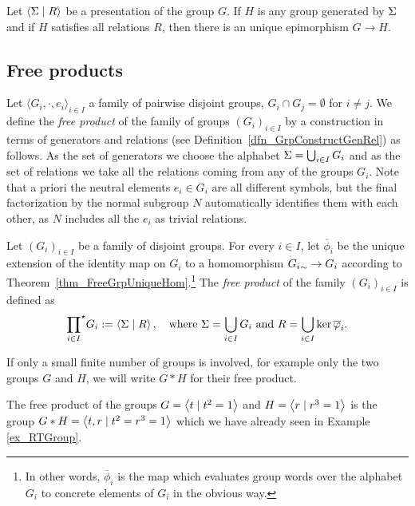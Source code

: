 \begin{theorem}
Let $\left\langle \Sigma \mid R \right\rangle$ be a presentation of the group $G$. If $H$ is any group generated by $\Sigma$ and if $H$ satisfies all relations $R$, then there is an unique epimorphism $G \to H$.
\end{theorem}

\subsection{Free products}

Let $\langle G_i, \cdot, e_i \rangle_{i \in I}$ a family of pairwise disjoint groups, \ie $G_i \cap G_j = \emptyset$ for $i \ne j$. We define the \emph{free product} of the family of groups $(G_i)_{i \in I}$ by a construction in terms of generators and relations (see Definition~\ref{dfn_GrpConstructGenRel}) as follows. As the set of generators we choose the alphabet $\Sigma = \bigcup_{i \in I} G_i$ and as the set of relations we take all the relations coming from any of the groups $G_i$. Note that a priori the neutral elements $e_i \in G_i$ are all different symbols, but the final factorization by the normal subgroup $N$ automatically identifies them with each other, as $N$ includes all the $e_i$ as trivial relations.

\begin{definition}
Let $(G_i)_{i \in I}$ be a family of disjoint groups. For every $i \in I$, let $\overline{\phi}_i$ be the unique extension of the identity map on $G_i$ to a homomorphism ${G_i}_{\sim} \to G_i$ according to Theorem~\ref{thm_FreeGrpUniqueHom}.\footnote{In other words, $\overline{\phi}_i$ is the map which evaluates group words over the alphabet $G_i$ to concrete elements of $G_i$ in the obvious way.} The \emph{free product} of the family $(G_i)_{i \in I}$ is defined as
\begin{equation*}
{\prod_{i \in I}}^{\star} G_i := \left\langle \Sigma \mid R \right\rangle, 
\quad \text{where } \Sigma = \bigcup_{i \in I} G_i \text{ and } R = \bigcup_{i \in I} \ker \overline{\varphi}_i.
\end{equation*} 
\end{definition}

If only a small finite number of groups is involved, for example only the two groups $G$ and $H$, we will write $G \ast H$ for their free product.

\begin{example}
\label{ex_RTFreeProd}
The free product of the groups $G = \left\langle t \mid t^2 = 1 \right\rangle$ and $H = \left\langle r \mid r^3 = 1 \right\rangle$ is the group $G \ast H = \left\langle t,r \mid t^2 = r^3 = 1 \right\rangle$ which we have already seen in Example \ref{ex_RTGroup}.
\end{example}

